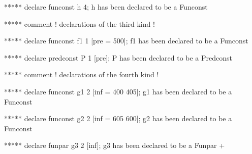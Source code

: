    ***** declare funconst h 4;
   h has been declared to be a Funconst
   
   ***** comment ! declarations of the third kind !
   
   ***** declare funconst f1 1 [pre = 500];
   f1 has been declared to be a Funconst
   
   ***** declare predconst P 1 [pre];
   P has been declared to be a Predconst
   
   ***** comment ! declarations of the fourth kind !
   
   ***** declare funconst g1 2 [inf = 400 405];
   g1 has been declared to be a Funconst
   
   ***** declare funconst g2 2 [inf = 605 600];
   g2 has been declared to be a Funconst
   
   ***** declare funpar g3 2 [inf];
   g3 has been declared to be a Funpar
+



